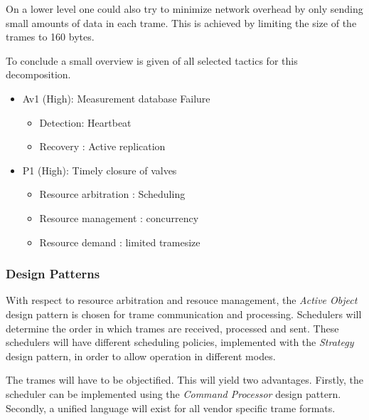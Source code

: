 \npar On a lower level one could also try to minimize network overhead by
only sending small amounts of data in each trame. This is achieved by
limiting the size of the trames to 160 bytes.

\npar To conclude a small overview is given of all selected tactics for this
decomposition.

\begin{itemize}
 	\item Av1 (High): Measurement database Failure
 	\begin{itemize}
 		\item Detection: Heartbeat 
 		\item Recovery : Active replication
 	\end{itemize}
  	\item P1 (High): Timely closure of valves
  	\begin{itemize}
  		\item Resource arbitration : Scheduling
		\item Resource management  : concurrency
		\item Resource demand      : limited tramesize
  	\end{itemize}
\end{itemize}

\subsubsection{Design Patterns}
\label{add:it1/patterns} %

\npar With respect to resource arbitration and resouce management, the
\emph{Active Object} design pattern is chosen for trame communication and
processing. Schedulers will determine the order in which trames are received,
processed and sent. These schedulers will have different scheduling policies,
implemented with the \emph{Strategy} design pattern, in order to allow operation
in different modes.

\npar The trames will have to be objectified. This will yield two advantages.
Firstly, the scheduler can be implemented using the \emph{Command Processor}
design pattern. Secondly, a unified language will exist for all vendor
specific trame formats.


